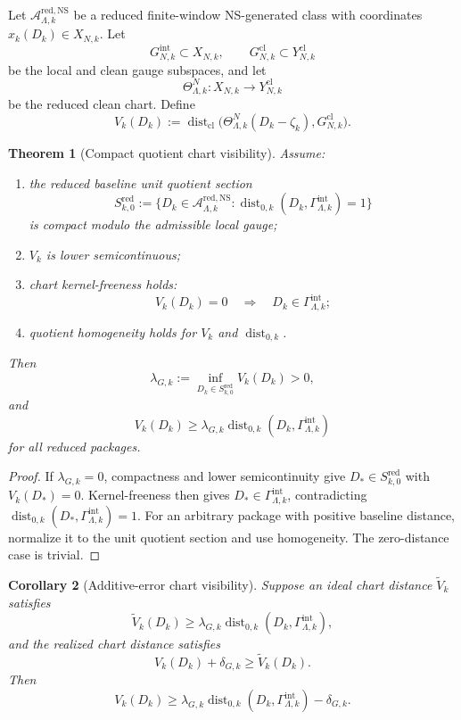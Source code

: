 \documentclass[11pt]{article}
\numberwithin{equation}{section}
\theoremstyle{plain}
\newtheorem{theorem}{Theorem}[section]
\newtheorem{corollary}[theorem]{Corollary}
\theoremstyle{definition}
\theoremstyle{remark}
\newcommand{\NS}{\mathrm{NS}}
\newcommand{\cl}{\mathrm{cl}}
\newcommand{\intg}{\mathrm{int}}
\newcommand{\Dist}{\operatorname{dist}}
\newcommand{\A}{\mathcal A}
\begin{document}
Let \(\A_{\Lambda,k}^{\mathrm{red},\NS}\) be a reduced finite-window
NS-generated class with coordinates \(x_k(D_k)\in X_{N,k}\).  Let
\[
  G_{N,k}^{\intg}\subset X_{N,k},\qquad
  G_{N,k}^{\cl}\subset Y_{N,k}^{\cl}
\]
be the local and clean gauge subspaces, and let
\[
  \Theta_{\Lambda,k}^{N}:X_{N,k}\to Y_{N,k}^{\cl}
\]
be the reduced clean chart.  Define
\[
  V_k(D_k)
  :=
  \Dist_{\cl}\bigl(\Theta_{\Lambda,k}^{N}(D_k-\zeta_k),
  G_{N,k}^{\cl}\bigr).
\]

\begin{theorem}[Compact quotient chart visibility]\label{thm:chart-vis}
Assume:
\begin{enumerate}[label=(\alph*)]
  \item the reduced baseline unit quotient section
  \[
    S_{k,0}^{\mathrm{red}}
    :=
    \{D_k\in\A_{\Lambda,k}^{\mathrm{red},\NS}:
    \Dist_{0,k}(D_k,\Gamma_{\Lambda,k}^{\intg})=1\}
  \]
  is compact modulo the admissible local gauge;
  \item \(V_k\) is lower semicontinuous;
  \item chart kernel-freeness holds:
  \[
    V_k(D_k)=0
    \quad\Longrightarrow\quad
    D_k\in\Gamma_{\Lambda,k}^{\intg};
  \]
  \item quotient homogeneity holds for \(V_k\) and \(\Dist_{0,k}\).
\end{enumerate}
Then
\[
  \lambda_{G,k}:=
  \inf_{D_k\in S_{k,0}^{\mathrm{red}}}V_k(D_k)>0,
\]
and
\[
  V_k(D_k)
  \ge
  \lambda_{G,k}\Dist_{0,k}(D_k,\Gamma_{\Lambda,k}^{\intg})
\]
for all reduced packages.
\end{theorem}

\begin{proof}
If \(\lambda_{G,k}=0\), compactness and lower semicontinuity give
\(D_*\in S_{k,0}^{\mathrm{red}}\) with \(V_k(D_*)=0\).  Kernel-freeness then
gives \(D_*\in\Gamma_{\Lambda,k}^{\intg}\), contradicting
\(\Dist_{0,k}(D_*,\Gamma_{\Lambda,k}^{\intg})=1\).  For an arbitrary package
with positive baseline distance, normalize it to the unit quotient section
and use homogeneity.  The zero-distance case is trivial.
\end{proof}

\begin{corollary}[Additive-error chart visibility]\label{cor:additive-chart}
Suppose an ideal chart distance \(\widetilde V_k\) satisfies
\[
  \widetilde V_k(D_k)
  \ge
  \lambda_{G,k}\Dist_{0,k}(D_k,\Gamma_{\Lambda,k}^{\intg}),
\]
and the realized chart distance satisfies
\[
  V_k(D_k)+\delta_{G,k}\ge \widetilde V_k(D_k).
\]
Then
\[
  V_k(D_k)
  \ge
  \lambda_{G,k}\Dist_{0,k}(D_k,\Gamma_{\Lambda,k}^{\intg})
  -\delta_{G,k}.
\]
\end{corollary}
\end{document}

